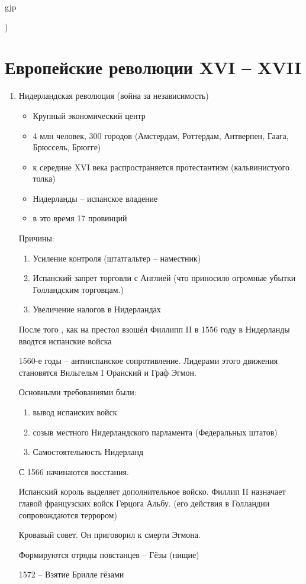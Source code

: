 gjp	 \documentclass[12pt,a4paper]{article}
\begin{document}
)

\section{Европейские революции XVI -- XVII}
\begin{enumerate}
	\item Нидерландская революция (война за независимость)	
	\begin{itemize}
		\item Крупный экономический центр
		\item 4 млн человек, 300 городов (Амстердам, Роттердам, Антверпен, Гаага, Брюссель, Брюгге)
		\item к середине XVI века распространяется протестантизм (кальвинистуого толка)
		\item Нидерланды -- испанское владение
		\item в это время 17 провинций
	\end{itemize}
	Причины:
	\begin{enumerate}
		\item Усиление контроля (штатгальтер -- наместник)
		\item Испанский запрет торговли с Англией (что приносило огромные убытки Голландским торговцам.)
		\item Увеличение налогов в Нидерландах
	\end{enumerate}
	После того , как на престол взошёл Филлипп II в 1556 году в Нидерланды вводтся испанские войска 
	
	1560-е годы -- антииспанское сопротивление. Лидерами этого движения становятся Вильгельм I Оранский и Граф Эгмон.
	
	Основными требованиями были:
	\begin{enumerate}
		\item вывод испанских войск
		\item созыв местного Нидерландского парламента (Федеральных штатов)
		\item Самостоятельность Нидерланд
	\end{enumerate}
	С 1566 начинаются восстания.
	
	Испанский король выделяет дополнительное войско. Филлип II назначает главой французских войск Герцога Альбу. (его действия в Голландии сопровождаются террором)
	
	Кровавый совет. Он приговорил к смерти Эгмона.
	
	Формируются отряды повстанцев -- Гёзы (нищие)
	
	1572 -- Взятие Брилле гёзами
	

\end{enumerate}
\end{document}
